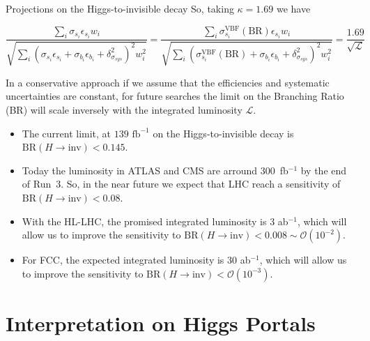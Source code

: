 \documentclass{../../bredelebeamer}
\begin{document}
\begin{frame}{Projections on the Higgs-to-invisible decay}
    So, taking $\kappa=1.69$ we have

    \begin{equation}
         \frac{\sum_i \sigma_{s_i} \epsilon_{s_i} w_i}{\sqrt{\sum_i (\sigma_{s_i}\epsilon_{s_i} + \sigma_{b_i}\epsilon_{b_i} + \delta_{\sigma_{sys}}^2)^2 w_i^2}}
         =
         \frac{\sum_i \sigma_{s_i}^{\text{VBF}}(\text{BR}) \epsilon_{s_i} w_i}{\sqrt{\sum_i (\sigma_{s_i}^{\text{VBF}}(\text{BR}) + \sigma_{b_i}\epsilon_{b_i} + \delta_{\sigma_{sys}}^2)^2 w_i^2}}
         = \frac{1.69}{\sqrt{\mathcal L}}
    \end{equation}

    In a conservative approach if we assume that the efficiencies and systematic uncertainties are constant, for future searches the limit on the Branching Ratio (BR) will scale inversely with the integrated luminosity $\mathcal{L}$. 
    \begin{itemize}
        \item The current limit, at $139 \text{ fb}^{-1}$ on the Higgs-to-invisible decay is $\text{BR}(H \to \text{inv}) < 0.145$.\pause
        \item Today the luminosity in ATLAS and CMS are arround 300~fb$^{-1}$ by the end of Run~3. So, in the near future we expect that LHC reach a sensitivity of $\text{BR}(H \to \text{inv}) < 0.08$.\pause
        \item With the HL-LHC, the promised integrated luminosity is 3 ab$^{-1}$, which will allow us to improve the sensitivity to $\text{BR}(H \to \text{inv}) < 0.008 \sim \mathcal{O}(10^{-2})$.\pause
        \item For FCC, the expected integrated luminosity is 30 ab$^{-1}$, which will allow us to improve the sensitivity to $\text{BR}(H \to \text{inv}) < \mathcal{O}(10^{-3})$.
    \end{itemize}
    
\end{frame}

\section{Interpretation on Higgs Portals}
\end{document}
